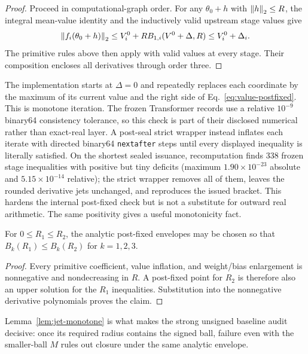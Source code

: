 \begin{proof}
Proceed in computational-graph order.  For any $\theta_0+h$ with
$\left\lVert h\right\rVert_2\le R$, the integral mean-value identity and the inductively valid
upstream stage values give
\begin{equation}
 \left\lVert f_i(\theta_0+h)\right\rVert_2
 \le V_i^0+R B_{1,i}(V^0+\Delta,R)\le V_i^0+\Delta_i.
\end{equation}
The primitive rules above then apply with valid values at every stage.  Their
composition encloses all derivatives through order three.
\end{proof}

The implementation starts at $\Delta=0$ and repeatedly replaces each
coordinate by the maximum of its current value and the right side of
Eq.~\eqref{eq:value-postfixed}.  This is monotone iteration.  The frozen
Transformer records use a relative $10^{-9}$ binary64 consistency tolerance,
so this check is part of their disclosed numerical rather than exact-real
layer.  A post-seal strict wrapper instead inflates each iterate with directed
binary64 \texttt{nextafter} steps until every displayed inequality is
literally satisfied.  On the shortest sealed issuance, recomputation finds 338
frozen stage inequalities with positive but tiny deficits (maximum
$1.90\times10^{-23}$ absolute and $5.15\times10^{-14}$ relative); the strict
wrapper removes all of them, leaves the rounded derivative jets unchanged, and
reproduces the issued bracket.  This hardens the internal post-fixed check but
is not a substitute for outward real arithmetic.  The same positivity gives a
useful monotonicity fact.

\begin{lemma}
\label{lem:jet-monotone}
For $0\le R_1\le R_2$, the analytic post-fixed envelopes may be chosen so that
$B_k(R_1)\le B_k(R_2)$ for $k=1,2,3$.
\end{lemma}

\begin{proof}
Every primitive coefficient, value inflation, and weight/bias enlargement is
nonnegative and nondecreasing in $R$.  A post-fixed point for $R_2$ is therefore
also an upper solution for the $R_1$ inequalities.  Substitution into the
nonnegative derivative polynomials proves the claim.
\end{proof}

Lemma~\ref{lem:jet-monotone} is what makes the strong unsigned baseline audit
decisive: once its required radius contains the signed ball, failure even with
the smaller-ball $M$ rules out closure under the same analytic envelope.

